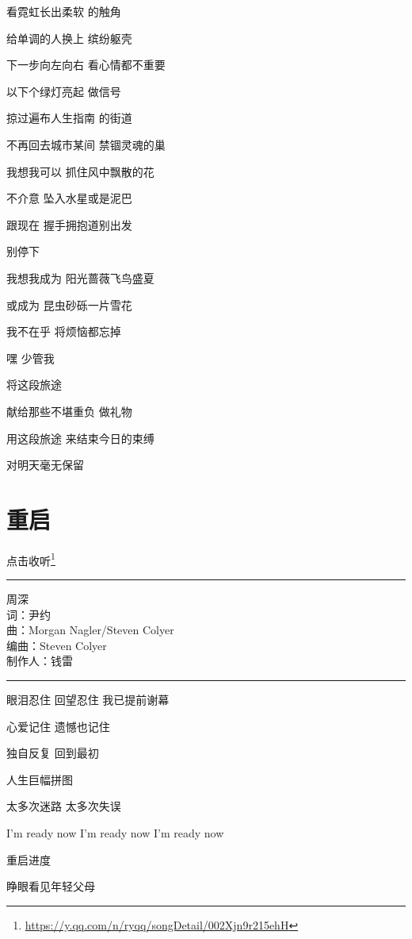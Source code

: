\documentclass[]{ctexbook}
\renewcommand{\href}[2]{#2\footnote{\url{#1}}}
\begin{document}
看霓虹长出柔软 的触角

给单调的人换上 缤纷躯壳

下一步向左向右 看心情都不重要

以下个绿灯亮起 做信号

掠过遍布人生指南 的街道

不再回去城市某间 禁锢灵魂的巢

我想我可以 抓住风中飘散的花

不介意 坠入水星或是泥巴

跟现在 握手拥抱道别出发

别停下

我想我成为 阳光蔷薇飞鸟盛夏

或成为 昆虫砂砾一片雪花

我不在乎 将烦恼都忘掉

嘿 少管我

将这段旅途

献给那些不堪重负 做礼物

用这段旅途 来结束今日的束缚

对明天毫无保留

\section*{重启}\label{restart}


\href{https://y.qq.com/n/ryqq/songDetail/002Xjn9r215ehH}{点击收听}

\begin{center}\rule{0.5\linewidth}{0.5pt}\end{center}

周深\\
词：尹约\\
曲：Morgan Nagler/Steven Colyer\\
编曲：Steven Colyer\\
制作人：钱雷

\begin{center}\rule{0.5\linewidth}{0.5pt}\end{center}

眼泪忍住 回望忍住 我已提前谢幕

心爱记住 遗憾也记住

独自反复 回到最初

人生巨幅拼图

太多次迷路 太多次失误

I'm ready now I'm ready now I'm ready now

重启进度

睁眼看见年轻父母
\end{document}
